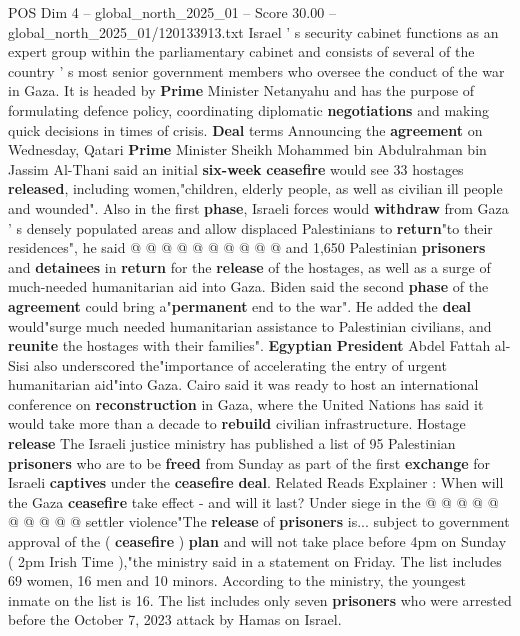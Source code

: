 \begin{textsample}{POS Dim 4 – global\_north\_2025\_01 – Score 30.00 – global\_north\_2025\_01/120133913.txt}
Israel ' s security cabinet functions as an expert group within the parliamentary cabinet and consists of several of the country ' s most senior government members who oversee the conduct of the war in Gaza.
It is headed by \textbf{Prime} Minister Netanyahu and has the purpose of formulating defence policy, coordinating diplomatic \textbf{negotiations} and making quick decisions in times of crisis. \textbf{Deal} terms Announcing the \textbf{agreement} on Wednesday, Qatari \textbf{Prime} Minister Sheikh Mohammed bin Abdulrahman bin Jassim Al-Thani said an initial \textbf{six-week} \textbf{ceasefire} would see 33 hostages \textbf{released}, including women,"children, elderly people, as well as civilian ill people and wounded".
Also in the first \textbf{phase}, Israeli forces would \textbf{withdraw} from Gaza ' s densely populated areas and allow displaced Palestinians to \textbf{return}"to their residences", he said @ @ @ @ @ @ @ @ @ @ and 1,650 Palestinian \textbf{prisoners} and \textbf{detainees} in \textbf{return} for the \textbf{release} of the hostages, as well as a surge of much-needed humanitarian aid into Gaza.
Biden said the second \textbf{phase} of the \textbf{agreement} could bring a"\textbf{permanent} end to the war".
He added the \textbf{deal} would"surge much needed humanitarian assistance to Palestinian civilians, and \textbf{reunite} the hostages with their families". \textbf{Egyptian} \textbf{President} Abdel Fattah al-Sisi also underscored the"importance of accelerating the entry of urgent humanitarian aid"into Gaza.
Cairo said it was ready to host an international conference on \textbf{reconstruction} in Gaza, where the United Nations has said it would take more than a decade to \textbf{rebuild} civilian infrastructure.
Hostage \textbf{release} The Israeli justice ministry has published a list of 95 Palestinian \textbf{prisoners} who are to be \textbf{freed} from Sunday as part of the first \textbf{exchange} for Israeli \textbf{captives} under the \textbf{ceasefire} \textbf{deal}.
Related Reads Explainer : When will the Gaza \textbf{ceasefire} take effect - and will it last?
Under siege in the @ @ @ @ @ @ @ @ @ @ settler violence"The \textbf{release} of \textbf{prisoners} is... subject to government approval of the ( \textbf{ceasefire} ) \textbf{plan} and will not take place before 4pm on Sunday ( 2pm Irish Time ),"the ministry said in a statement on Friday.
The list includes 69 women, 16 men and 10 minors.
According to the ministry, the youngest inmate on the list is 16.
The list includes only seven \textbf{prisoners} who were arrested before the October 7, 2023 attack by Hamas on Israel.

\end{textsample}
